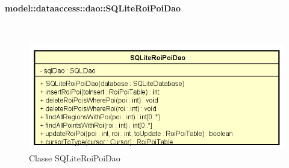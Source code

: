 \documentclass[../DefinizioneDiProdotto.tex]{subfiles}
\begin{document}
\paragraph{model::dataaccess::dao::SQLiteRoiPoiDao}
\
\begin{figure}[H]
	\centering
	\includegraphics[width=\maxwidth]{img/SQLiteRoiPoiDao.png}
	\caption{Classe SQLiteRoiPoiDao}\label{fig:model::dataaccess::dao::SQLiteRoiPoiDao} 
\end{figure}
\end{document}
